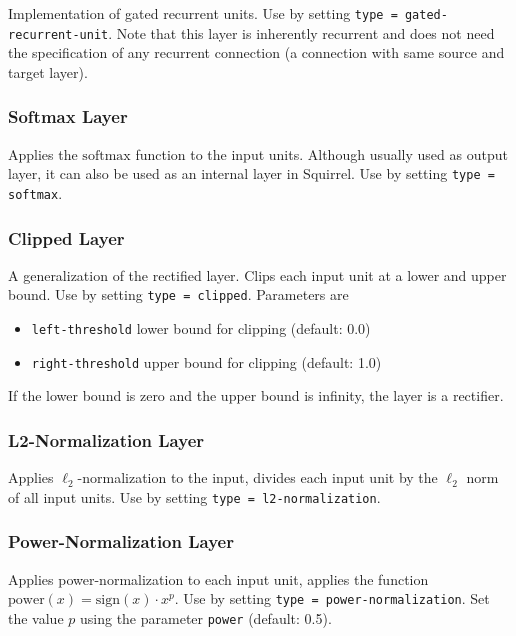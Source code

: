 Implementation of gated recurrent units. Use by setting \texttt{type = gated-recurrent-unit}. Note that this layer is inherently recurrent and does not need the specification of any recurrent connection (\ie a connection with same source and target layer).

\subsubsection*{Softmax Layer}

Applies the $ \mathrm{softmax} $ function to the input units. Although usually used as output layer, it can also be used as an internal layer in Squirrel. Use by setting \texttt{type = softmax}.

\subsubsection*{Clipped Layer}

A generalization of the rectified layer. Clips each input unit at a lower and upper bound. Use by setting \texttt{type = clipped}. Parameters are
\begin{itemize}
    \item \texttt{left-threshold} lower bound for clipping (default: 0.0)
    \item \texttt{right-threshold} upper bound for clipping (default: 1.0)
\end{itemize}
If the lower bound is zero and the upper bound is infinity, the layer is a rectifier.

\subsubsection*{L2-Normalization Layer}

Applies $ \ell_2 $-normalization to the input, \ie divides each input unit by the $ \ell_2 $ norm of all input units. Use by setting \texttt{type = l2-normalization}.

\subsubsection*{Power-Normalization Layer}

Applies power-normalization to each input unit, \ie applies the function $ \mathrm{power}(x) = \mathrm{sign}(x) \cdot x^p $. Use by setting \texttt{type = power-normalization}.
Set the value $ p $ using the parameter \texttt{power} (default: 0.5).

